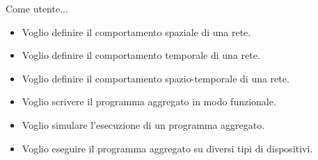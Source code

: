 Come utente...
\begin{itemize}
    \item Voglio definire il comportamento spaziale di una rete.
    \item Voglio definire il comportamento temporale di una rete.
    \item Voglio definire il comportamento spazio-temporale di una rete.
    \item Voglio scrivere il programma aggregato in modo funzionale.
    \item Voglio simulare l'esecuzione di un programma aggregato.
    \item Voglio eseguire il programma aggregato su diversi tipi di dispositivi.
\end{itemize}

